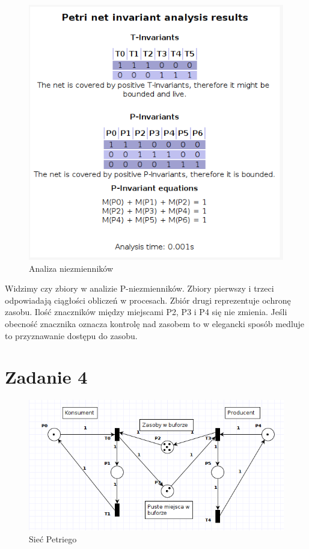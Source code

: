 \documentclass[12pt,a4paper,table]{article}
\begin{document}
    \begin{figure}[H]
        \centering
        \includegraphics[width=0.6\linewidth]{img/zad3-2.png}
        \caption{Analiza niezmienników}
        \label{fig:zad3-2}
    \end{figure}

    Widzimy czy zbiory w analizie P-niezmienników. Zbiory pierwszy i trzeci odpowiadają ciągłości
    obliczeń w procesach. Zbiór drugi reprezentuje ochronę zasobu. 
    Ilość znaczników między miejscami P2, P3 i P4 się nie zmienia. Jeśli obecność znacznika oznacza
    kontrolę nad zasobem to w elegancki sposób medluje to przyznawanie dostępu do zasobu.

    \section{Zadanie 4}

    \begin{figure}[H]
        \centering
        \includegraphics[width=0.8\linewidth]{img/zad4-1.png}
        \caption{Sieć Petriego}
        \label{fig:zad4-1}
    \end{figure}
\end{document}
